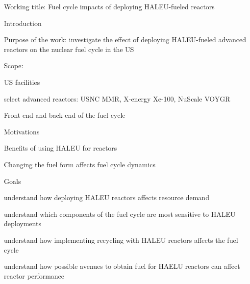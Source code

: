 \documentclass{report}
\begin{document}
\noindent Working title: Fuel cycle impacts of deploying \gls{HALEU}-fueled reactors
\begin{outline}
\item Introduction
\begin{outline}
    \item Purpose of the work: investigate the effect of deploying HALEU-fueled 
          advanced reactors on the nuclear fuel cycle in the US 
    \item Scope:
    \begin{outline}
        \item US facilities
        \item select advanced reactors: USNC MMR, X-energy Xe-100, NuScale VOYGR
        \item Front-end and back-end of the fuel cycle
    \end{outline}
    \item Motivations
    \begin{outline}
        \item Benefits of using HALEU for reactors 
        \item Changing the fuel form affects fuel cycle dynamics
    \end{outline}
    \item Goals
    \begin{outline}
        \item understand how deploying HALEU reactors affects resource demand
        \item understand which components of the fuel cycle are most sensitive to HALEU deployments
        \item understand how implementing recycling with HALEU reactors affects the fuel cycle
        \item understand how possible avenues to obtain fuel for HAELU reactors can affect reactor performance
    \end{outline}
\end{outline}


\end{outline}
\end{document}

